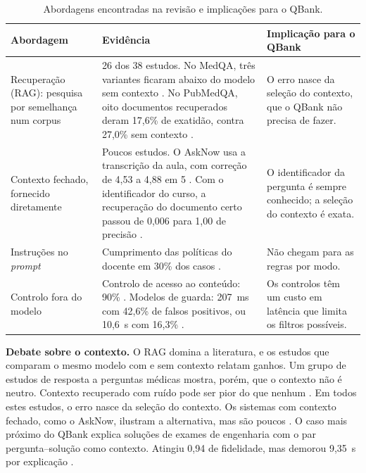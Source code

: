 \documentclass[11pt,a4paper]{article}
\begin{document}
\begin{table}[htbp]
\caption{Abordagens encontradas na revisão e implicações para o QBank.}
\label{tab:abordagens}
\centering
\footnotesize
\begin{tabularx}{\textwidth}{p{2.6cm} X X}
\toprule
\textbf{Abordagem} & \textbf{Evidência} & \textbf{Implicação para o QBank} \\
\midrule
Recuperação (RAG): pesquisa por semelhança num corpus & 26 dos 38 estudos. No MedQA, três variantes ficaram abaixo do modelo sem contexto \parencite{xie2026when}. No PubMedQA, oito documentos recuperados deram 17,6\% de exatidão, contra 27,0\% sem contexto \parencite{rahat2026noise}. & O erro nasce da seleção do contexto, que o QBank não precisa de fazer. \\
\addlinespace
Contexto fechado, fornecido diretamente & Poucos estudos. O AskNow usa a transcrição da aula, com correção de 4,53 a 4,88 em 5 \parencite{liu2026asknow}. Com o identificador do curso, a recuperação do documento certo passou de 0,006 para 1,00 de precisão \parencite{wei2026cloud}. & O identificador da pergunta é sempre conhecido; a seleção do contexto é exata. \\
\addlinespace
Instruções no \emph{prompt} & Cumprimento das políticas do docente em 30\% dos casos \parencite{rayhan2026sage}. & Não chegam para as regras por modo. \\
\addlinespace
Controlo fora do modelo & Controlo de acesso ao conteúdo: 90\% \parencite{rayhan2026sage}. Modelos de guarda: 207~ms com 42,6\% de falsos positivos, ou 10,6~s com 16,3\% \parencite{walczak2026comparative}. & Os controlos têm um custo em latência que limita os filtros possíveis. \\
\bottomrule
\end{tabularx}
\end{table}

\textbf{Debate sobre o contexto.} O RAG \parencite{hu2025advancing} domina a literatura, e os estudos que comparam o mesmo modelo com e sem contexto relatam ganhos. Um grupo de estudos de resposta a perguntas médicas mostra, porém, que o contexto não é neutro. Contexto recuperado com ruído pode ser pior do que nenhum \parencite{xie2026when,rahat2026noise}. Em todos estes estudos, o erro nasce da seleção do contexto. Os sistemas com contexto fechado, como o AskNow, ilustram a alternativa, mas são poucos \parencite{liu2026asknow}. O caso mais próximo do QBank explica soluções de exames de engenharia com o par pergunta--solução como contexto. Atingiu 0,94 de fidelidade, mas demorou 9,35~s por explicação \parencite{khan2025towards}.
\end{document}
